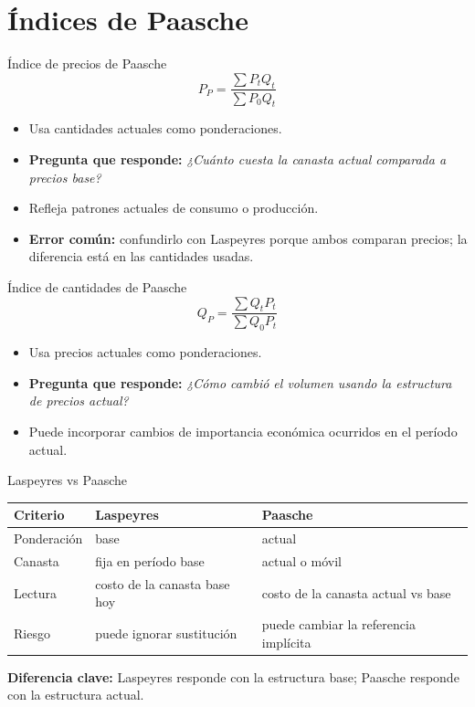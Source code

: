 \documentclass[aspectratio=169,11pt]{beamer}
\newcommand{\pregunta}[1]{\textbf{Pregunta que responde:} \emph{#1}}
\newcommand{\errorcomun}[1]{\textbf{Error común:} #1}
\newcommand{\diferencia}[1]{\textbf{Diferencia clave:} #1}
\begin{document}
\section{Índices de Paasche}

\begin{frame}{Índice de precios de Paasche}
\[
P_P=\frac{\sum P_tQ_t}{\sum P_0Q_t}
\]
\begin{itemize}
  \item Usa cantidades actuales como ponderaciones.
  \item \pregunta{¿Cuánto cuesta la canasta actual comparada a precios base?}
  \item Refleja patrones actuales de consumo o producción.
  \item \errorcomun{confundirlo con Laspeyres porque ambos comparan precios; la diferencia está en las cantidades usadas.}
\end{itemize}
\end{frame}

\begin{frame}{Índice de cantidades de Paasche}
\[
Q_P=\frac{\sum Q_tP_t}{\sum Q_0P_t}
\]
\begin{itemize}
  \item Usa precios actuales como ponderaciones.
  \item \pregunta{¿Cómo cambió el volumen usando la estructura de precios actual?}
  \item Puede incorporar cambios de importancia económica ocurridos en el período actual.
\end{itemize}
\end{frame}

\begin{frame}{Laspeyres vs Paasche}
\small
\begin{center}
\begin{tabular}{p{}p{}p{}}
\toprule
Criterio & Laspeyres & Paasche \\
\midrule
Ponderación & base & actual \\
Canasta & fija en período base & actual o móvil \\
Lectura & costo de la canasta base hoy & costo de la canasta actual vs base \\
Riesgo & puede ignorar sustitución & puede cambiar la referencia implícita \\
\bottomrule
\end{tabular}
\end{center}
\diferencia{Laspeyres responde con la estructura base; Paasche responde con la estructura actual.}
\end{frame}
\end{document}
